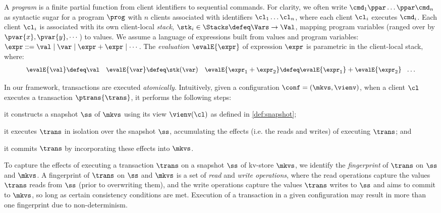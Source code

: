 A {\em program} is a finite partial function from client identifiers to sequential
commands.
For clarity, we often write \( \cmd_{1}\ppar \dots \ppar \cmd_{n}\) as syntactic sugar 
for a program \( \prog \) with $n$ clients associated with identifiers
$\cl_1 \dots \cl_n$, where each client $\cl_i$ executes
$\cmd_i$. 
Each client $\cl_i$ is associated with its own client-local  \emph{stack}, 
$\stk_i \in \Stacks \defeq \Vars \to \Val$,  mapping program variables
(ranged over by $\pvar{x}, \pvar{y}, \cdots$)
to values. 
We assume a language of expressions built from values
and program variables:
$\expr ::= \val \mid \var \mid \expr + \expr \mid \cdots$.
The \emph{evaluation} $\evalE{\expr}$ of  expression $\expr$ is parametric in
the client-local stack, where:%
%
{%
\begin{gather*}
\small
\evalE{\val} \defeq
\val
\quad
\evalE{\var} \defeq
\stk(\var)
\quad
\evalE{\expr_{1} + \expr_{2}} \defeq
\evalE{\expr_{1}} + \evalE{\expr_{2}}
\ \ 
\dots
\end{gather*}%
}%

In our framework, transactions are executed \emph{atomically}. 
Intuitively, given a configuration $\conf = (\mkvs, \vienv)$, 
when a client $\cl$ executes a transaction $\ptrans{\trans}$, 
it performs the following steps: 
\begin{enumerate*}
	\item it constructs a snapshot $\ss$ of $\mkvs$ using its view $\vienv(\cl)$ as defined in \cref{def:snapshot};  
	\item it executes $\trans$ in isolation over the snapshot $\ss$, accumulating the  
effects (i.e. the reads and writes) of executing $\trans$; and
	\item it commits $\trans$ by incorporating these effects into $\mkvs$.
\end{enumerate*}


To capture the effects of executing a transaction $\trans$ on a snapshot $\ss$ of kv-store $\mkvs$, 
we identify the \emph{fingerprint} of $\trans$ on $\ss$ and $\mkvs$.
A fingerprint of $\trans$ on $\ss$ and $\mkvs$
is a set of \emph{read} and \emph{write operations}, where
the read operations capture the values $\trans$ reads from $\ss$ (prior to overwriting them), and
the write operations capture the values $\trans$ writes to $\ss$ and aims to commit to $\mkvs$, so long as certain consistency conditions are met.  
Execution of a transaction in a given configuration may result in more than one fingerprint due to non-determinism. 

